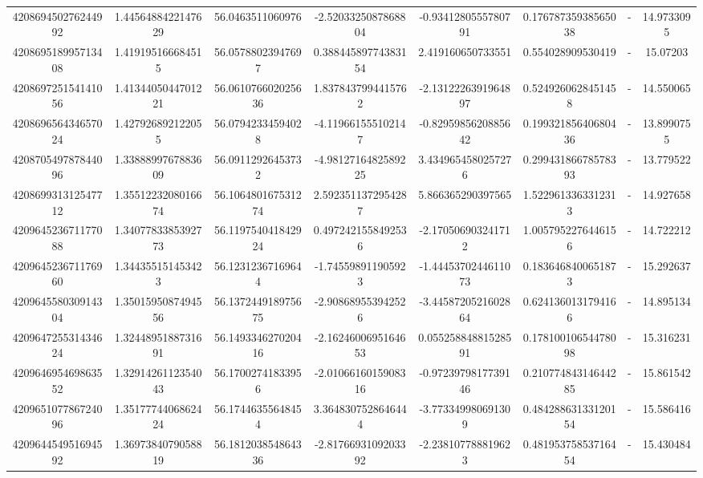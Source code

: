 \documentclass{article}
\begin{document}
\begin{landscape}
\begin{longtable}[c]{S[table-format=18.0]S[table-format=2.15]S[table-format=2.15]S[table-format=-2.17]S[table-format=-2.16]S[table-format=-2.16]S[table-format=-3.16]S[table-format=2.7]}
420869450276244992 & 1.4456488422147629 & 56.0463511060976   & -2.5203325087868804  & -0.9341280555780791    & 0.17678735938565038 & {-}                  & 14.9733095 \\
420869518995713408 & 1.419195166684515  & 56.05788023947697  & 0.38844589774383154  & 2.419160650733551      & 0.554028909530419   & {-}                  & 15.07203   \\
420869725154141056 & 1.4134405044701221 & 56.061076602025636 & 1.8378437994415762   & -2.1312226391964897    & 0.5249260628451458  & {-}                  & 14.550065  \\
420869656434657024 & 1.427926892122055  & 56.07942334594028  & -4.119661555102147   & -0.8295985620885642    & 0.19932185640680436 & {-}                  & 13.8990755 \\
420870549787844096 & 1.3388899767883609 & 56.09112926453732  & -4.9812716482589225  & 3.4349654580257276     & 0.29943186678578393 & {-}                  & 13.779522  \\
420869931312547712 & 1.3551223208016674 & 56.106480167531274 & 2.5923511372954287   & 5.866365290397565      & 1.5229613363312313  & {-}                  & 14.927658  \\
420964523671177088 & 1.3407783385392773 & 56.119754041842924 & 0.4972421558492536   & -2.170506903241712     & 1.0057952276446156  & {-}                  & 14.722212  \\
420964523671176960 & 1.344355151453423  & 56.12312367169644  & -1.745598911905923   & -1.4445370244611073    & 0.1836468400651873  & {-}                  & 15.292637  \\
420964558030914304 & 1.3501595087494556 & 56.137244918975675 & -2.908689553942526   & -3.4458720521602864    & 0.6241360131794166  & {-}                  & 14.895134  \\
420964725531434624 & 1.3244895188731691 & 56.149334627020416 & -2.1624600695164653  & 0.05525884881528591    & 0.17810010654478098 & {-}                  & 15.316231  \\
420964695469863552 & 1.3291426112354043 & 56.17002741833956  & -2.0106616015908316  & -0.9723979817739146    & 0.21077484314644285 & {-}                  & 15.861542  \\
420965107786724096 & 1.3517774406862424 & 56.17446355648454  & 3.3648307528646444   & -3.773349980691309     & 0.48428863133120154 & {-}                  & 15.586416  \\
420964454951694592 & 1.3697384079058819 & 56.181203854864336 & -2.8176693109203392  & -2.238107788819623     & 0.48195375853716454 & {-}                  & 15.430484  \\

\end{longtable}
\end{landscape}
\end{document}
